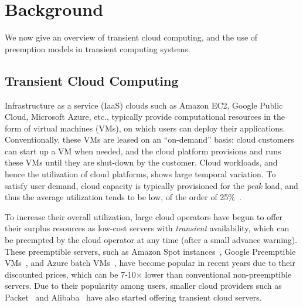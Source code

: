 \vspace*{\subsecspace}
\section{Background}

We now give an overview of transient cloud computing, and the  use of preemption models in transient computing systems. 



\vspace*{\subsecspace}
\subsection{Transient Cloud Computing}

Infrastructure as a service (IaaS) clouds such as Amazon EC2, Google Public Cloud, Microsoft Azure, etc., typically provide computational resources in the form of virtual machines (VMs), on which users can deploy their applications.
Conventionally, these VMs are leased on an ``on-demand'' basis: cloud customers can start up a VM when needed, and the cloud platform provisions and runs these VMs until they are shut-down by the customer. 
Cloud workloads, and hence the utilization of cloud platforms, shows large temporal variation. 
To satisfy user demand, cloud capacity is typically provisioned for the \emph{peak} load, and thus the average utilization tends to be low, of the order of 25\%~\cite{borg,resource-central-sosp17}. 


To increase their overall utilization, large cloud operators have begun to offer their surplus resources as low-cost servers \footnotemark with \emph{transient} availability, which can be preempted by the cloud operator at any time (after a small advance warning). 
These preemptible servers, such as Amazon Spot instances~\cite{ec2-spot}, Google Preemptible VMs~\cite{preemptible-documentation}, and Azure batch VMs~\cite{azure-batch}, have become popular in recent years due to their discounted prices, which can be 7-10$\times$ lower than conventional non-preemptible servers.
%
Due to their popularity among users, smaller cloud providers such as Packet~\cite{packet-spot} and Alibaba~\cite{alibaba-spot} have also started offering transient cloud servers. 

